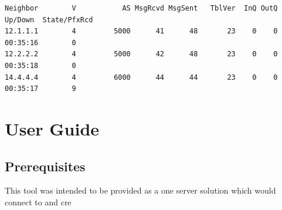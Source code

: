 \documentclass[11pt]{report}
\begin{document}
\begin{appendices}
\begin{lstlisting}
Neighbor        V           AS MsgRcvd MsgSent   TblVer  InQ OutQ Up/Down  State/PfxRcd
12.1.1.1        4         5000      41      48       23    0    0 00:35:16        0
12.2.2.2        4         5000      42      48       23    0    0 00:35:18        0
14.4.4.4        4         6000      44      44       23    0    0 00:35:17        9
\end{lstlisting}

\chapter{User Guide}

\section{Prerequisites}

This tool was intended to be provided as a one server solution which would connect to and cre

\end{appendices}
\end{document}
